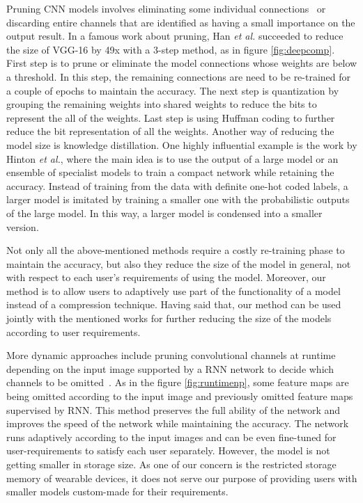 Pruning CNN models involves eliminating some individual connections~\cite{molchanov2016pruning} \cite{Yu_2018_CVPR}\cite{Wang2018StructuredPP} or discarding entire channels \cite{He_2017_ICCV}\cite{li2016pruning} that are identified as having a small importance on the output result.
In a famous work about pruning\cite{han2015deep}, Han \emph{et al.} succeeded to reduce the size of VGG-16 by 49x with a 3-step method, as in figure \ref{fig:deepcomp}. 
First step is to prune or eliminate the model connections whose weights are below a threshold. 
In this step, the remaining connections are need to be re-trained for a couple of epochs to maintain the accuracy.
The next step is quantization by grouping the remaining weights into shared weights to reduce the bits to represent the all of the weights.
Last step is using Huffman coding to further reduce the bit representation of all the weights. 
Another way of reducing the model size is knowledge distillation. 
One highly influential example is the work by Hinton \emph{et al.}, where the main idea is to use the output of a large model or an ensemble of specialist models to train a compact network while retaining the accuracy.
Instead of training from the data with definite one-hot coded labels, a larger model is imitated by training a smaller one with the probabilistic outputs of the large model.
In this way, a larger model is condensed into a smaller version.

Not only all the above-mentioned methods require a costly re-training phase to maintain the accuracy,
but also they reduce the size of the model in general, not with respect to each user's requirements of using the model. 
Moreover, our method is to allow users to adaptively use part of the functionality of a model instead of a compression technique.
Having said that, our method can be used jointly with the mentioned works for further reducing the size of the models according to user requirements.

More dynamic approaches include pruning convolutional channels at runtime depending on the input image supported by a RNN network to decide which channels to be omitted~\cite{Lin2017RuntimeNP}. 
As in the figure \ref{fig:runtimenp}, some feature maps are being omitted according to the input image and previously omitted feature maps supervised by RNN.
This method preserves the full ability of the network and improves the speed of the network while maintaining the accuracy. 
The network runs adaptively according to the input images and
can be even fine-tuned for user-requirements to satisfy each user separately.
However, the model is not getting smaller in storage size. 
As one of our concern is the restricted storage memory of wearable devices, it does not serve our purpose of providing users with smaller models custom-made for their requirements. 

